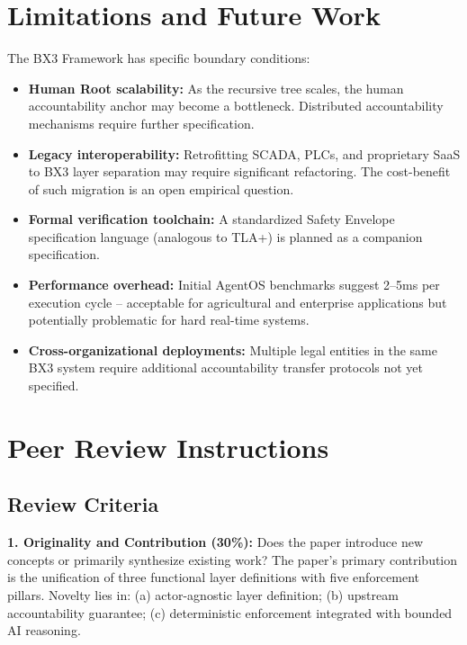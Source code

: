 \documentclass[12pt]{article}
\begin{document}

\section{Limitations and Future Work}
\label{sec:limitations}
The BX3 Framework has specific boundary conditions:

\begin{itemize}
    \item \textbf{Human Root scalability:} As the recursive tree scales, the human accountability anchor may become a bottleneck. Distributed accountability mechanisms require further specification.
    \item \textbf{Legacy interoperability:} Retrofitting SCADA, PLCs, and proprietary SaaS to BX3 layer separation may require significant refactoring. The cost-benefit of such migration is an open empirical question.
    \item \textbf{Formal verification toolchain:} A standardized Safety Envelope specification language (analogous to TLA+) is planned as a companion specification.
    \item \textbf{Performance overhead:} Initial AgentOS benchmarks suggest 2--5ms per execution cycle -- acceptable for agricultural and enterprise applications but potentially problematic for hard real-time systems.
    \item \textbf{Cross-organizational deployments:} Multiple legal entities in the same BX3 system require additional accountability transfer protocols not yet specified.
\end{itemize}

\section*{Peer Review Instructions}
\label{sec:peer-review}

\subsection*{Review Criteria}

\textbf{1. Originality and Contribution (30\%):} Does the paper introduce new concepts or primarily synthesize existing work? The paper's primary contribution is the unification of three functional layer definitions with five enforcement pillars. Novelty lies in: (a) actor-agnostic layer definition; (b) upstream accountability guarantee; (c) deterministic enforcement integrated with bounded AI reasoning.
\end{document}
